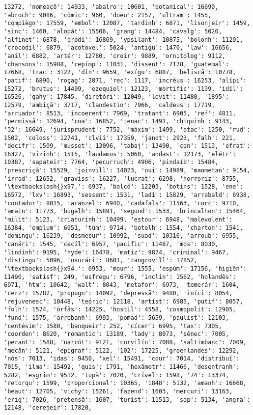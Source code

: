 \documentclass[11pt]{article}
\begin{document}
\begin{Verbatim}[commandchars=\\\{\}]
13272, 'nomeaçõ': 14933, 'abalro': 10601, 'botanical': 16690, 'abroch': 9086, 'cômic': 960, 'doeu': 2157, 'ultram': 1455, 'compiègn': 17559, 'embol': 12087, 'tardinh': 6871, 'lisonjeir': 1459, 'sinc': 1460, 'alopát': 15506, 'grang': 14484, 'cavalg': 5020, 'alfinet': 6878, 'bródi': 16869, 'ypsilant': 10875, 'bolonh': 11201, 'crocodil': 6879, 'acotovel': 5024, 'antigu': 1470, 'law': 16656, 'anil': 6882, 'artér': 12780, 'croir': 9889, 'ornitolog': 9112, 'chansons': 15988, 'repimp': 11031, 'dissent': 7178, 'guatemal': 17668, 'trac': 3122, 'din': 9659, 'exígu': 6887, 'beliscã': 10778, 'patif': 6890, 'roçag': 2871, 'rec': 1117, 'incréus': 16253, 'alípi': 15272, 'brutus': 14499, 'ezequiel': 12123, 'mortific': 1139, 'idíl': 16526, 'gahy': 17845, 'diretóri': 12049, 'levit': 11480, '1895': 12579, 'ambiçã': 3717, 'clandestin': 7966, 'caldeus': 17719, 'arruador': 8513, 'incoerent': 7969, 'tratant': 6905, 'ref': 4811, 'permissã': 12694, 'coa': 16852, 'tenac': 1491, 'chiquinh': 9143, '32': 16649, 'jurisprudent': 7752, 'máxim': 1499, 'atac': 1250, 'rud': 1502, 'coloss': 12741, 'clvii': 17359, 'janot': 2923, 'falh': 221, 'decifr': 1509, 'musset': 13096, 'tabaj': 13490, 'cen': 1513, 'efrat': 16327, 'vizinh': 1515, 'laudamus': 5060, 'andast': 12173, 'elétr': 10387, 'sapateir': 7764, 'pecurruch': 4906, 'pindaíb': 15484, 'prescriçã': 15529, 'joinvill': 14023, 'oui': 14989, 'maometan': 9154, 'irrad': 12652, 'gravíss': 16227, 'lucrat': 6298, 'horroriz': 8755, '\textbackslash{}x97,': 6937, 'balcõ': 12203, 'botins': 1528, 'ene': 16572, 'lxv': 16893, 'sessent': 1531, 'ladi': 15829, 'arrabald': 6938, 'contador': 8015, 'aranzel': 6940, 'cadafals': 11563, 'corc': 9710, 'amain': 11773, 'bugalh': 15891, 'segund': 1533, 'brincalhon': 15464, 'milit': 5123, 'criaturinh': 10499, 'estour': 6948, 'malevolent': 16384, 'emplum': 6951, 'túm': 9714, 'botelh': 1554, 'charton': 1541, 'domingu': 16239, 'desmesur': 10992, 'suad': 10316, 'arroub': 6955, 'canári': 1545, 'cecíl': 6957, 'pacific': 11487, 'mos': 8030, 'lindinh': 9195, 'hyde': 16478, 'matiz': 9874, 'criminal': 9467, 'distingu': 5096, 'usurári': 8601, 'tangrovill': 17852, '\textbackslash{}x94.': 6953, 'mour': 1555, 'espúm': 17156, 'higiên': 11490, 'satisf': 249, 'esfregu': 6796, 'inclin': 1562, 'holandês': 6971, 'htm': 10642, 'walt': 8043, 'metafor': 6973, 'temerár': 1604, 'cerz': 15782, 'propugn': 14092, 'depressã': 9480, 'iníci': 8054, 'rejuvenesc': 10448, 'teóric': 12118, 'artíst': 6985, 'putif': 8057, 'folh': 1574, 'órfãs': 14225, 'hostil': 4558, 'cosmopolit': 12905, 'fund': 1575, 'arrebanh': 6993, 'pomad': 5659, 'paulist': 12103, 'centésim': 1580, 'banqueir': 252, 'cícer': 6995, 'tax': 7305, 'coorden': 8620, 'romantic': 13189, 'lady': 8073, 'sênec': 7005, 'perant': 1588, 'narcót': 9121, 'curvilín': 7008, 'saltimbanc': 7009, 'mecân': 5121, 'epígraf': 5122, '102': 17225, 'groenlandes': 12292, 'nós': 7013, 'idas': 9450, 'xel': 15491, 'cour': 7014, 'distribuí': 7015, 'ilma': 15492, 'quis': 1791, 'hexâmetr': 11466, 'desentranh': 5282, 'esgrim': 9512, 'tupã': 7020, 'crível': 1598, '74': 13374, 'retorqu': 1599, 'proporcional': 10365, '1848': 5132, 'amanh': 16668, 'beaut': 12705, 'vichy': 15261, 'fazend': 1603, 'mercuri': 13163, 'erig': 7026, 'pretensã': 1607, 'turist': 11513, 'sop': 5134, 'angra': 12148, 'cerejeir': 17820, 
\end{Verbatim}
\end{document}
